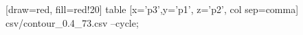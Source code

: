   [draw=red, fill=red!20] table [x='p3',y='p1', z='p2', col sep=comma] {csv/contour_0.4_73.csv} --cycle; 

